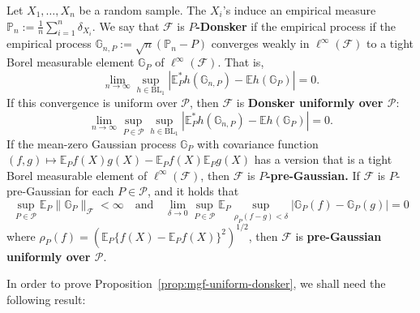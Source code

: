 \documentclass{article}
\theoremstyle{definition}
\newcommand{\E}{\mathbb{E}}
\newcommand{\1}{\mathbbm{1}}
\begin{document}
 Let $X_1, \dots, X_n$ be a random sample. The $X_i$'s induce an empirical measure $\mathbb P_n := \frac1n \sum_{i=1}^n \delta_{X_i}$.
 We say that $\mathcal F$ is \textbf{$P$-Donsker} if the empirical process if the empirical process $\mathbb G_{n, P} := \sqrt n(\mathbb P_n - P)$ converges weakly in $\ell^\infty (\mathcal F)$ to a tight Borel measurable element $\mathbb G_P$ of $\ell^\infty(\mathcal F)$. That is, 
\begin{equation}
    \lim_{n \to \infty} \sup_{h \in \text{BL}_1} |\E^*_Ph(\mathbb G_{n, P}) - \E h(\mathbb G_P)| = 0.
    \label{eqn:ptwise-donsker}
\end{equation}
If this convergence is uniform over $\mathcal P$, then $\mathcal F$ is \textbf{Donsker uniformly over $\mathcal P$}:
\[
\lim_{n \to \infty} \sup_{P \in \mathcal P} \sup_{h \in \text{BL}_1} |\E^*_Ph(\mathbb G_{n, P}) - \E h(\mathbb G_P)| = 0.
\]
If the mean-zero Gaussian process $\mathbb G_P$ with covariance function $(f, g) \mapsto \E_{P}f(X)g(X) - \E_Pf(X)\E_Pg(X)$ has a version that is a tight Borel measurable element of $\ell^\infty(\mathcal F)$, then $\mathcal F$ is \textbf{$P$-pre-Gaussian.} If $\mathcal F$ is $P$-pre-Gaussian for each $P \in \mathcal P$, and it holds that
\[
\sup_{P \in \mathcal P} \E_P \|\mathbb G_P\|_{\mathcal F} < \infty \quad \text{and} \quad \lim_{\delta \to 0} \sup_{P \in \mathcal P} \E_P \sup_{\rho_P(f-g) < \delta} |\mathbb G_P(f) - \mathbb G_P(g)| = 0
\]
where $\rho_P(f) = \left(\E_P\{f(X) - \E_Pf(X)\}^2\right)^{1/2}$, then $\mathcal F$ is \textbf{pre-Gaussian uniformly over $\mathcal P$}. 

In order to prove Proposition~\ref{prop:mgf-uniform-donsker}, we shall need the following result: 
\end{document}
